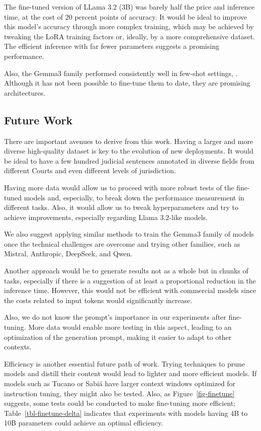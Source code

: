 \documentclass[
  12pt,
]{article}
\begin{document}
The fine-tuned version of LLama 3.2 (3B) was barely half the price and
inference time, at the cost of 20 percent points of accuracy. It would
be ideal to improve this model's accuracy through more complex training,
which may be achieved by tweaking the LoRA training factors or, ideally,
by a more comprehensive dataset. The efficient inference with far fewer
parameters suggests a promising performance.

Also, the Gemma3 family performed consistently well in few-shot
settings, . Although it has not been possible to fine-tune them to date,
they are promising architectures.

\subsection{Future Work}\label{sec-future-research}

There are important avenues to derive from this work. Having a larger
and more diverse high-quality dataset is key to the evolution of new
deployments. It would be ideal to have a few hundred judicial sentences
annotated in diverse fields from different Courts and even different
levels of jurisdiction.

Having more data would allow us to proceed with more robust tests of the
fine-tuned models and, especially, to break down the performance
measurement in different tasks. Also, it would allow us to tweak
hyperparameters and try to achieve improvements, especially regarding
Llama 3.2-like models.

We also suggest applying similar methods to train the Gemma3 family of
models once the technical challenges are overcome and trying other
families, such as Mistral, Anthropic, DeepSeek, and Qwen.

Another approach would be to generate results not as a whole but in
chunks of tasks, especially if there is a suggestion of at least a
proportional reduction in the inference time. However, this would not be
efficient with commercial models since the costs related to input tokens
would significantly increase.

Also, we do not know the prompt's importance in our experiments after
fine-tuning. More data would enable more testing in this aspect, leading
to an optimization of the generation prompt, making it easier to adapt
to other contexts.

Efficiency is another essential future path of work. Trying techniques
to prune models and distill their content would lead to lighter and more
efficient models. If models such as Tucano or Sabiá have larger context
windows optimized for instruction tuning, they might also be tested.
Also, as Figure~\ref{fig-finetune} suggests, some tests could be
conducted to make fine-tuning more efficient;
Table~\ref{tbl-finetune-delta} indicates that experiments with models
having 4B to 10B parameters could achieve an optimal efficiency.
\end{document}
